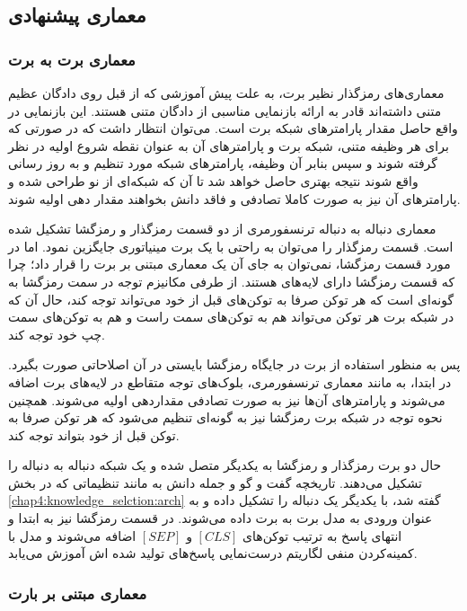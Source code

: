 \subsection{معماری پیشنهادی}

\subsubsection{معماری برت به برت}

معماری‌های رمزگذار نظیر برت، به علت پیش آموزشی که از قبل روی دادگان عظیم متنی داشته‌اند قادر به ارائه بازنمایی مناسبی از دادگان متنی هستند. این بازنمایی در واقع حاصل مقدار پارامتر‌های شبکه برت است. می‌توان انتظار داشت که در صورتی که برای هر وظیفه متنی،‌ شبکه برت و پارامتر‌های آن به عنوان نقطه شروع اولیه در نظر گرفته شوند و سپس بنابر آن وظیفه، پارامتر‌های شبکه مورد تنظیم و به روز رسانی واقع شوند نتیجه بهتری حاصل خواهد شد تا آن که شبکه‌ای از نو طراحی شده و پارامتر‌های آن نیز به صورت کاملا تصادفی و فاقد دانش بخواهند مقدار دهی اولیه شوند. 

معماری دنباله به دنباله ترنسفورمری از دو قسمت رمزگذار و رمزگشا تشکیل شده است. قسمت رمزگذار را می‌توان به راحتی با یک برت مینیاتوری جایگزین نمود. اما در مورد قسمت رمزگشا، نمی‌توان به جای آن  یک معماری مبتنی بر برت را قرار داد؛ چرا که قسمت رمزگشا دارای لایه‌های 
هستند. از طرفی مکانیزم توجه در سمت رمزگشا به گونه‌ای است که هر توکن صرفا به توکن‌های قبل از خود می‌تواند توجه کند، حال آن که در شبکه برت هر توکن می‌تواند هم به توکن‌های سمت راست و هم به توکن‌های سمت چپ خود توجه کند. 

پس به منظور استفاده از برت در جایگاه رمزگشا بایستی در آن اصلاحاتی صورت بگیرد. در ابتدا، به مانند معماری ترنسفورمری،‌ بلوک‌های توجه متقاطع در لایه‌های برت اضافه می‌شوند و پارامتر‌های آن‌ها نیز به صورت تصادفی مقداردهی اولیه می‌شوند. همچنین نحوه توجه در شبکه برت رمزگشا نیز به گونه‌ای تنظیم می‌شود که هر توکن صرفا به توکن قبل از خود بتواند توجه کند.

حال دو برت رمزگذار و رمزگشا به یکدیگر متصل شده و یک شبکه دنباله به دنباله را تشکیل می‌دهند. تاریخچه گفت و گو و جمله دانش به مانند تنظیماتی که در 
بخش 
\ref{chap4:knowledge_selction:arch}
گفته شد، با یکدیگر یک دنباله را تشکیل داده و به عنوان ورودی به مدل برت به برت داده می‌شوند. در قسمت رمزگشا نیز به ابتدا و انتهای پاسخ به ترتیب توکن‌های
$[CLS]$
و
$[SEP]$
اضافه می‌شوند و مدل با کمینه‌کردن منفی لگاریتم درست‌نمایی پاسخ‌های تولید شده اش  آموزش می‌یابد.  

\subsubsection{معماری مبتنی بر بارت}

